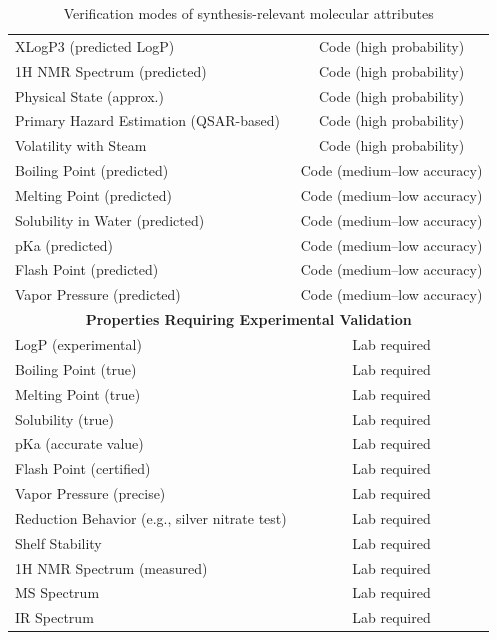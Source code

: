 \documentclass[10pt]{article} %
\begin{document}
\begin{table}[ht]
\begin{tabular}{|l|c|}
\hline
XLogP3 (predicted LogP) & Code (high probability) \\
1H NMR Spectrum (predicted) & Code (high probability) \\
Physical State (approx.) & Code (high probability) \\
Primary Hazard Estimation (QSAR-based) & Code (high probability) \\
Volatility with Steam & Code (high probability) \\
Boiling Point (predicted) & Code (medium–low accuracy) \\
Melting Point (predicted) & Code (medium–low accuracy) \\
Solubility in Water (predicted) & Code (medium–low accuracy) \\
pKa (predicted) & Code (medium–low accuracy) \\
Flash Point (predicted) & Code (medium–low accuracy) \\
Vapor Pressure (predicted) & Code (medium–low accuracy) \\
\hline
\multicolumn{2}{|c|}{\textbf{Properties Requiring Experimental Validation}} \\
\hline
LogP (experimental) & Lab required \\
Boiling Point (true) & Lab required \\
Melting Point (true) & Lab required \\
Solubility (true) & Lab required \\
pKa (accurate value) & Lab required \\
Flash Point (certified) & Lab required \\
Vapor Pressure (precise) & Lab required \\
Reduction Behavior (e.g., silver nitrate test) & Lab required \\
Shelf Stability & Lab required \\
1H NMR Spectrum (measured) & Lab required \\
MS Spectrum & Lab required \\
IR Spectrum & Lab required \\
\hline
\end{tabular}
\caption{Verification modes of synthesis-relevant molecular attributes}
\label{tab:chem_synthesis_descriptors}
\end{table}
\end{document}
